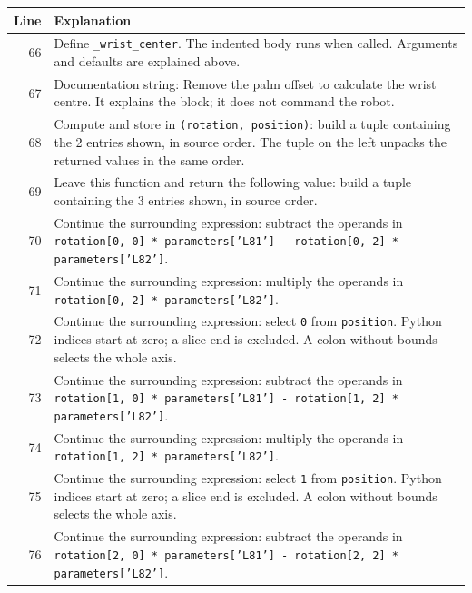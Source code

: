 \documentclass[11pt,a4paper]{book}
\begin{document}
\begin{longtable}{r p{}}

\textbf{Line} & \textbf{Explanation} \\ \hline \endhead

66 & Define \texttt{\_wrist\_center}. The indented body runs when called. Arguments and defaults are explained above. \\

67 & Documentation string: Remove the palm offset to calculate the wrist centre. It explains the block; it does not command the robot. \\

68 & Compute and store in \texttt{(rotation, position)}: build a tuple containing the 2 entries shown, in source order. The tuple on the left unpacks the returned values in the same order. \\

69 & Leave this function and return the following value: build a tuple containing the 3 entries shown, in source order. \\

70 & Continue the surrounding expression: subtract the operands in \texttt{rotation[0, 0] * parameters['L81'] - rotation[0, 2] * parameters['L82']}. \\

71 & Continue the surrounding expression: multiply the operands in \texttt{rotation[0, 2] * parameters['L82']}. \\

72 & Continue the surrounding expression: select \texttt{0} from \texttt{position}. Python indices start at zero; a slice end is excluded. A colon without bounds selects the whole axis. \\

73 & Continue the surrounding expression: subtract the operands in \texttt{rotation[1, 0] * parameters['L81'] - rotation[1, 2] * parameters['L82']}. \\

74 & Continue the surrounding expression: multiply the operands in \texttt{rotation[1, 2] * parameters['L82']}. \\

75 & Continue the surrounding expression: select \texttt{1} from \texttt{position}. Python indices start at zero; a slice end is excluded. A colon without bounds selects the whole axis. \\

76 & Continue the surrounding expression: subtract the operands in \texttt{rotation[2, 0] * parameters['L81'] - rotation[2, 2] * parameters['L82']}. \\


\end{longtable}
\end{document}
